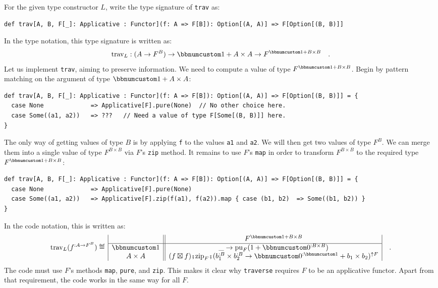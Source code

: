 For the given type constructor $L$, write the type signature of \lstinline!trav!
as:
\begin{lstlisting}
def trav[A, B, F[_]: Applicative : Functor](f: A => F[B]): Option[(A, A)] => F[Option[(B, B)]]
\end{lstlisting}
In the type notation, this type signature is written as:
\[
\text{trav}_{L}:(A\rightarrow F^{B})\rightarrow\bbnum 1+A\times A\rightarrow F^{\bbnum 1+B\times B}\quad.
\]
 Let us implement \lstinline!trav!, aiming to preserve information.
We need to compute a value of type $F^{\bbnum 1+B\times B}$. Begin
by pattern matching on the argument of type $\bbnum 1+A\times A$:
\begin{lstlisting}
def trav[A, B, F[_]: Applicative : Functor](f: A => F[B]): Option[(A, A)] => F[Option[(B, B)]] = {
  case None             => Applicative[F].pure(None)  // No other choice here.
  case Some((a1, a2))   => ???   // Need a value of type F[Some[(B, B)]] here.
}
\end{lstlisting}
The only way of getting values of type $B$ is by applying \lstinline!f!
to the values \lstinline!a1! and \lstinline!a2!. We will then get
two values of type $F^{B}$. We can merge them into a single value
of type $F^{B\times B}$ via $F$\textsf{'}s \lstinline!zip! method. It remains
to use $F$\textsf{'}s \lstinline!map! in order to transform $F^{B\times B}$
to the required type $F^{\bbnum 1+B\times B}$:
\begin{lstlisting}
def trav[A, B, F[_]: Applicative : Functor](f: A => F[B]): Option[(A, A)] => F[Option[(B, B)]] = {
  case None             => Applicative[F].pure(None)
  case Some((a1, a2))   => Applicative[F].zip(f(a1), f(a2)).map { case (b1, b2)  => Some((b1, b2)) }
}
\end{lstlisting}
In the code notation, this is written as:
\[
\text{trav}_{L}(f^{:A\rightarrow F^{B}})\triangleq\,\begin{array}{|c||c|}
 & F^{\bbnum 1+B\times B}\\
\hline \bbnum 1 & \_\rightarrow\text{pu}_{F}(1+\bbnum 0^{:B\times B})\\
A\times A & (f\boxtimes f)\bef\text{zip}_{F}\bef(b_{1}^{:B}\times b_{2}^{:B}\rightarrow\bbnum 0^{:\bbnum 1}+b_{1}\times b_{2})^{\uparrow F}
\end{array}\quad.
\]
The code must use $F$\textsf{'}s methods \lstinline!map!, \lstinline!pure!,
and \lstinline!zip!. This makes it clear why \lstinline!traverse!
requires $F$ to be an applicative functor. Apart from that requirement,
the code works in the same way for all $F$.

